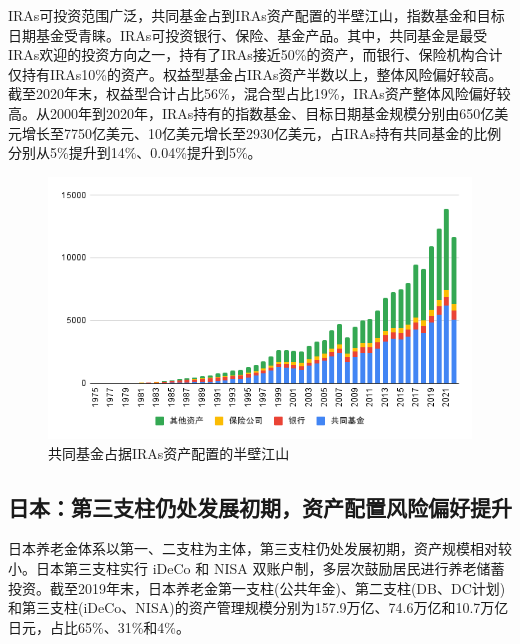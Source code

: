 \documentclass[a4paper,zihao=5]{ctexart}
\begin{document}
IRAs可投资范围广泛，共同基金占到IRAs资产配置的半壁江山，指数基金和目标日期基金受青睐。IRAs可投资银行、保险、基金产品。其中，共同基金是最受IRAs欢迎的投资方向之一，持有了IRAs接近50\%的资产，而银行、保险机构合计仅持有IRAs10\%的资产。权益型基金占IRAs资产半数以上，整体风险偏好较高。截至2020年末，权益型合计占比56\%，混合型占比19\%，IRAs资产整体风险偏好较高。从2000年到2020年，IRAs持有的指数基金、目标日期基金规模分别由650亿美元增长至7750亿美元、10亿美元增长至2930亿美元，占IRAs持有共同基金的比例分别从5\%提升到14\%、0.04\%提升到5\%。
\begin{figure}[H]
    \centering
    \includegraphics[width=\linewidth]{img/共同基金占据IRAs资产配置的半壁江山.png}
    \caption{共同基金占据IRAs资产配置的半壁江山}
\end{figure}

\subsection{日本：第三支柱仍处发展初期，资产配置风险偏好提升}
日本养老金体系以第一、二支柱为主体，第三支柱仍处发展初期，资产规模相对较小。日本第三支柱实行 iDeCo 和 NISA 双账户制，多层次鼓励居民进行养老储蓄投资。截至2019年末，日本养老金第一支柱(公共年金)、第二支柱(DB、DC计划)和第三支柱(iDeCo、NISA)的资产管理规模分别为157.9万亿、74.6万亿和10.7万亿日元，占比65\%、31\%和4\%。
\end{document}

